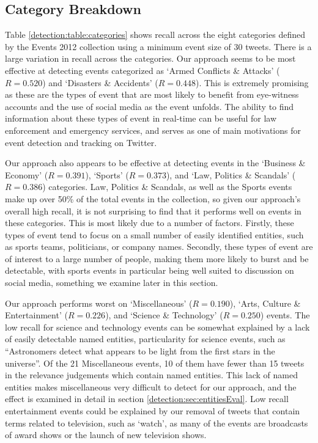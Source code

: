\subsection{Category Breakdown}

Table \ref{detection:table:categories} shows recall across the eight categories defined by the Events 2012 collection using a minimum event size of 30 tweets.
There is a large variation in recall across the categories.
Our approach seems to be most effective at detecting events categorized as  `Armed Conflicts \& Attacks' ($R=0.520$) and `Disasters \& Accidents' ($R=0.448$).
This is extremely promising as these are the types of event that are most likely to benefit from eye-witness accounts and the use of social media as the event unfolds.
The ability to find information about these types of event in real-time can be useful for law enforcement and emergency services, and serves as one of main motivations for event detection and tracking on Twitter.

Our approach also appears to be effective at detecting events in the `Business \& Economy' ($R=0.391$), `Sports' ($R=0.373$), and `Law, Politics \& Scandals' ($R=0.386$) categories.
Law, Politics \& Scandals, as well as the Sports events make up over 50\% of the total events in the collection, so given our approach's overall high recall, it is not surprising to find that it performs well on events in these categories.
This is most likely due to a number of factors. Firstly, these types of event tend to focus on a small number of easily identified entities, such as sports teams, politicians, or company names.
Secondly, these types of event are of interest to a large number of people, making them more likely to burst and be detectable, with sports events in particular being well suited to discussion on social media, something we examine later in this section.

Our approach performs worst on `Miscellaneous' ($R=0.190$), `Arts, Culture \& Entertainment' ($R=0.226$), and `Science \& Technology' ($R=0.250$) events.
The low recall for science and technology events can be somewhat explained by a lack of easily detectable named entities, particularity for science events, such as ``Astronomers detect what appears to be light from the first stars in the universe''. Of the 21 Miscellaneous events, 10 of them have fewer than 15 tweets in the relevance judgements which contain named entities.
This lack of named entities makes miscellaneous very difficult to detect for our approach, and the effect is examined in detail in section \ref{detection:sec:entitiesEval}.
Low recall entertainment events could be explained by our removal of tweets that contain terms related to television, such as `watch', as many of the events are broadcasts of award shows or the launch of new television shows.

